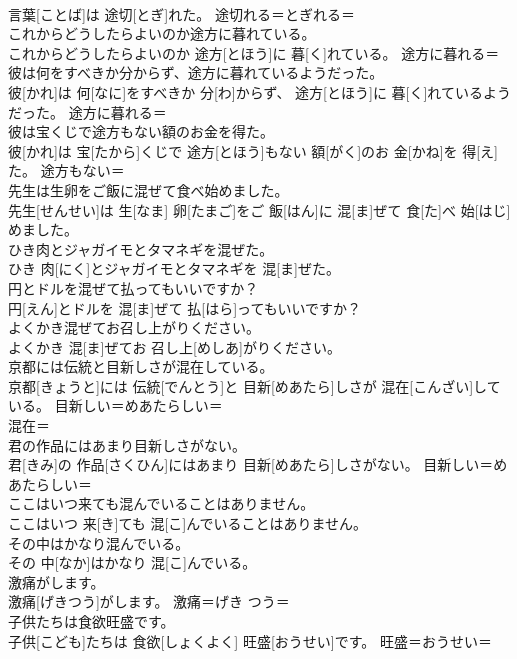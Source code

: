 \documentclass[8pt]{extreport}
\begin{document}
\begin{CJK}{UTF8}{min}
\\	言葉[ことば]は 途切[とぎ]れた。	途切れる＝とぎれる＝ 
\\	これからどうしたらよいのか途方に暮れている。	
\\	これからどうしたらよいのか 途方[とほう]に 暮[く]れている。	途方に暮れる＝ 
\\	彼は何をすべきか分からず、途方に暮れているようだった。	
\\	彼[かれ]は 何[なに]をすべきか 分[わ]からず、 途方[とほう]に 暮[く]れているようだった。	途方に暮れる＝ 
\\	彼は宝くじで途方もない額のお金を得た。	
\\	彼[かれ]は 宝[たから]くじで 途方[とほう]もない 額[がく]のお 金[かね]を 得[え]た。	途方もない＝ 
\\	先生は生卵をご飯に混ぜて食べ始めました。	
\\	先生[せんせい]は 生[なま] 卵[たまご]をご 飯[はん]に 混[ま]ぜて 食[た]べ 始[はじ]めました。	
\\	ひき肉とジャガイモとタマネギを混ぜた。	
\\	ひき 肉[にく]とジャガイモとタマネギを 混[ま]ぜた。	
\\	円とドルを混ぜて払ってもいいですか？	
\\	円[えん]とドルを 混[ま]ぜて 払[はら]ってもいいですか？	
\\	よくかき混ぜてお召し上がりください。	
\\	よくかき 混[ま]ぜてお 召し上[めしあ]がりください。	
\\	京都には伝統と目新しさが混在している。	
\\	京都[きょうと]には 伝統[でんとう]と 目新[めあたら]しさが 混在[こんざい]している。	目新しい＝めあたらしい＝ 
\\	混在＝ 
\\	君の作品にはあまり目新しさがない。	
\\	君[きみ]の 作品[さくひん]にはあまり 目新[めあたら]しさがない。	目新しい＝めあたらしい＝ 
\\	ここはいつ来ても混んでいることはありません。	
\\	ここはいつ 来[き]ても 混[こ]んでいることはありません。	
\\	その中はかなり混んでいる。	
\\	その 中[なか]はかなり 混[こ]んでいる。	
\\	激痛がします。	
\\	激痛[げきつう]がします。	激痛＝げき つう＝ 
\\	子供たちは食欲旺盛です。	
\\	子供[こども]たちは 食欲[しょくよく] 旺盛[おうせい]です。	旺盛＝おうせい＝ 

\end{CJK}
\end{document}
